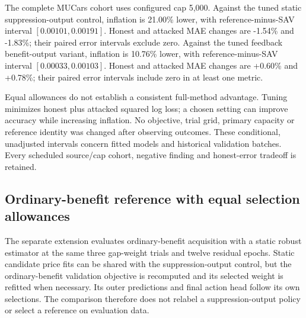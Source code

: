 \documentclass[10pt,journal]{IEEEtran}
\begin{document}
The complete MUCars cohort uses configured cap 5,000. Against the tuned static suppression-output control, inflation is 21.00\% lower, with reference-minus-SAV interval $[0.00101,0.00191]$. Honest and attacked MAE changes are -1.54\% and -1.83\%; their paired error intervals exclude zero. Against the tuned feedback benefit-output variant, inflation is 10.76\% lower, with reference-minus-SAV interval $[0.00033,0.00103]$. Honest and attacked MAE changes are +0.60\% and +0.78\%; their paired error intervals include zero in at least one metric.

Equal allowances do not establish a consistent full-method advantage. Tuning minimizes honest plus attacked squared log loss; a chosen setting can improve accuracy while increasing inflation. No objective, trial grid, primary capacity or reference identity was changed after observing outcomes. These conditional, unadjusted intervals concern fitted models and historical validation batches. Every scheduled source/cap cohort, negative finding and honest-error tradeoff is retained.

\subsection{Ordinary-benefit reference with equal selection allowances}
The separate extension evaluates ordinary-benefit acquisition with a static
robust estimator at the same three gap-weight trials and twelve residual
epochs. Static candidate price fits can be shared with the suppression-output
control, but the ordinary-benefit validation objective is recomputed and its
selected weight is refitted when necessary. Its outer predictions and final
action head follow its own selections. The comparison therefore does not
relabel a suppression-output policy or select a reference on evaluation data.
\end{document}
